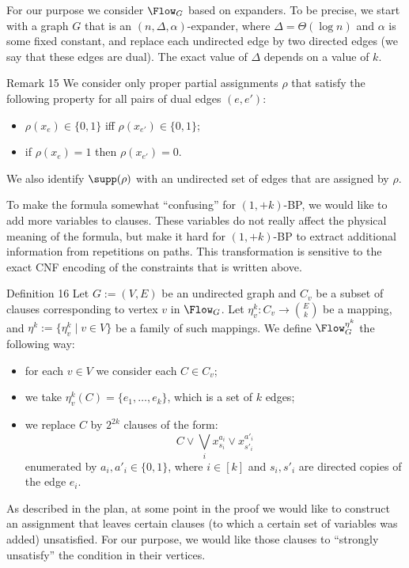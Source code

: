 For our purpose we consider $\Flow_G$ based on expanders. To be precise, we start with a graph $G$ that is an $(n,\Delta,\alpha)$-expander, where $\Delta=\Theta(\log n)$ and $\alpha$ is some fixed constant, and replace each undirected edge by two directed edges (we say that these edges are dual). The exact value of $\Delta$ depends on a value of $k$.
\begin{result}{Remark 15}
We consider only proper partial assignments $\rho$ that satisfy the following property for all pairs of dual edges $(e,e')$:
\begin{itemize}\item $\rho(x_e)\in\{0,1\}$ iff $\rho(x_{e'})\in\{0,1\}$;
\item if $\rho(x_e)=1$ then $\rho(x_{e'})=0$.\end{itemize}
We also identify $\supp(\rho)$ with an undirected set of edges that are assigned by $\rho$.
\end{result}
To make the formula somewhat ``confusing'' for $(1,+k)$-BP, we would like to add more variables to clauses. These variables do not really affect the physical meaning of the formula, but make it hard for $(1,+k)$-BP to extract additional information from repetitions on paths. This transformation is sensitive to the exact CNF encoding of the constraints that is written above.
\begin{result}{Definition 16}
Let $G:=(V,E)$ be an undirected graph and $C_v$ be a subset of clauses corresponding to vertex $v$ in $\Flow_G$. Let $\eta_v^k:C_v\to\binom{E}{k}$ be a mapping, and $\eta^k:=\{\eta_v^k\mid v\in V\}$ be a family of such mappings. We define $\Flow_G^{\eta^k}$ the following way:
\begin{itemize}\item for each $v\in V$ we consider each $C\in C_v$;
\item we take $\eta_v^k(C)=\{e_1,\ldots,e_k\}$, which is a set of $k$ edges;
\item we replace $C$ by $2^{2k}$ clauses of the form:
\[C\vee\bigvee_i x_{s_i}^{a_i}\vee x_{s'_i}^{a'_i}\]
enumerated by $a_i,a'_i\in\{0,1\}$, where $i\in[k]$ and $s_i,s'_i$ are directed copies of the edge $e_i$.\end{itemize}
\end{result}
As described in the plan, at some point in the proof we would like to construct an assignment that leaves certain clauses (to which a certain set of variables was added) unsatisfied. For our purpose, we would like those clauses to ``strongly unsatisfy'' the condition in their vertices.
